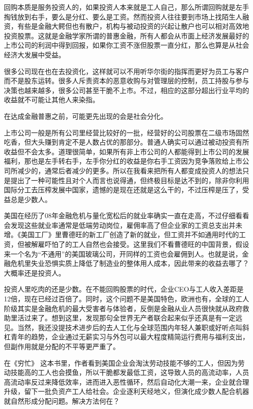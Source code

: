 \documentclass[]{book}
\begin{document}
回购本质是服务投资人的，如果投资人本来就是工人自己，那么所谓回购就是左手掏钱放到右手，要么是分红、要么是工资。然而投资人往往要到市场上找陌生人融资，有些是金融大鳄但也有散户，机构与被动投资的兴起让散户也可以相对高效地投资股票。这就是金融学家所谓的普惠金融，所有人都会从市面上经济发展最好的上市公司的利润中得到回报，如果你工资不涨但股票一直分红，那么也算是从社会经济大发展中受益。

很多公司现在也在去投资化，这样就可以不用听华尔街的指挥而更好为员工与客户而不是股东运转。很多人斥责资本的恶意收购与对管理层的控制，员工持股与参与决策也越来越多，很多公司甚至干脆不上市。不过，相应的这部分超出行业平均的收益就不可能让其他人来染指。

在达成金融普惠之前，可能更先出现的会是社会分化。

上市公司一般是所有公司里经营比较好的一批，经营好的公司股票在二级市场固然吃香，但大头赚到肯定不是人数占优的那部分。普通人确实可以通过被动投资有所收益但不会太多。道理很简单，如果所有非上市公司的人都能得到上市公司的发展福利，那也是左手转右手，左手你分红的收益是你右手工资因为竞争落败给上市公司所减少的，通常后者减少的更多。所以在我看来把所有人都变成投资人的想法只是提出了一种可能性且对个人而言也说得通，但终极目标是达不到的，除非你利用国际分工去压榨发展中国家，遗憾的是现在还就是这么干的，不过压榨是压了，受益总是少数人。

美国在经历了08年金融危机与量化宽松后的就业率确实一直在走高，不过仔细看看会发现这些就业率通常是低端劳动岗位，雇佣率高了但企业家的工资总支出并未增。《美国工厂》里曹德旺的新工厂创造了新的就业，但工资并不如通用时代的工资，但被解雇吓怕了的工人自然也会接受。这里我们不看曹德旺的中国背景，假设来一个名为``不通用''的美国玻璃公司，开同样的工资也会雇佣到人。也就是说，金融危机里失业恐惧实质上降低了制造业的整体用人成本，因此带来的收益去哪了？大概率还是投资人。

投资人里吃肉的还是少数。在不能回购股票的时代，企业CEO与工人收入差距是12倍，现在已经过百倍了。同时，这个问题不是美国特色，欧洲也有，全球的工人阶级其实是金融危机的最大受害者与体验者，反倒是金融从业人员很快就从政府救助里活过来了。想到这里，发现那句全世界无产者联合起来似乎还真是有一定远见。当然，我还没提技术进步后的去人工化与全球范围内年轻人兼职或好听点叫斜杠青年的趋势，企业通过无薪实习与外包可以最大程度精简运行费用与福利支出，但副作用就是分配的不平等更严重了。

在《穷忙》 这本书里，作者看到美国企业会淘汰劳动技能不够的工人，但因为劳动技能高的工人也会摸鱼，所以干脆都发最低工资，这导致人员的高流动率，人员高流动率反过来降低效率，进而进入恶性循环，然后自动化大潮一来，企业就合理升级，留下一批负资产工人给社会。企业逐利天经地义，但演化成少数人配合机器就自然形成分配问题。解决方法何在？
\end{document}

